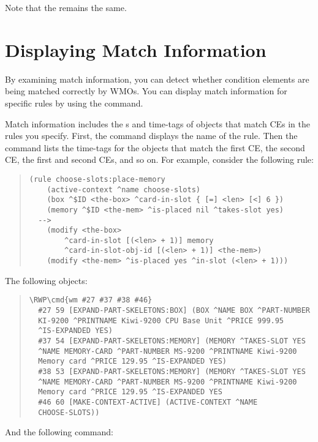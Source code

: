 Note that the  remains the same.

\section{Displaying Match Information}

By examining match information, you can detect whether condition
elements are being matched correctly by WMOs. You can display match
information for specific rules by using the  command.

Match information includes the s and time-tags of
objects that match CEs in the rules you specify. First, the command
displays the name of the rule. Then the command lists the time-tags
for the objects that match the first CE, the second CE, the first and
second CEs, and so on. For example, consider the following rule:

\begin{quote}
\begin{verbatim}
(rule choose-slots:place-memory
    (active-context ^name choose-slots)
    (box ^$ID <the-box> ^card-in-slot { [=] <len> [<] 6 })
    (memory ^$ID <the-mem> ^is-placed nil ^takes-slot yes)
  -->
    (modify <the-box>
        ^card-in-slot [(<len> + 1)] memory
        ^card-in-slot-obj-id [(<len> + 1)] <the-mem>)
    (modify <the-mem> ^is-placed yes ^in-slot (<len> + 1)))
\end{verbatim}
\end{quote}

The following objects:

\begin{quote}
\begin{Verbatim}[commandchars=\\\{\}]
\RWP\cmd{wm #27 #37 #38 #46}
  #27 59 [EXPAND-PART-SKELETONS:BOX] (BOX ^NAME BOX ^PART-NUMBER
  KI-9200 ^PRINTNAME Kiwi-9200 CPU Base Unit ^PRICE 999.95
  ^IS-EXPANDED YES)
  #37 54 [EXPAND-PART-SKELETONS:MEMORY] (MEMORY ^TAKES-SLOT YES
  ^NAME MEMORY-CARD ^PART-NUMBER MS-9200 ^PRINTNAME Kiwi-9200
  Memory card ^PRICE 129.95 ^IS-EXPANDED YES)
  #38 53 [EXPAND-PART-SKELETONS:MEMORY] (MEMORY ^TAKES-SLOT YES
  ^NAME MEMORY-CARD ^PART-NUMBER MS-9200 ^PRINTNAME Kiwi-9200
  Memory card ^PRICE 129.95 ^IS-EXPANDED YES
  #46 60 [MAKE-CONTEXT-ACTIVE] (ACTIVE-CONTEXT ^NAME
  CHOOSE-SLOTS))
\end{Verbatim}
\end{quote}

And the following  command:

